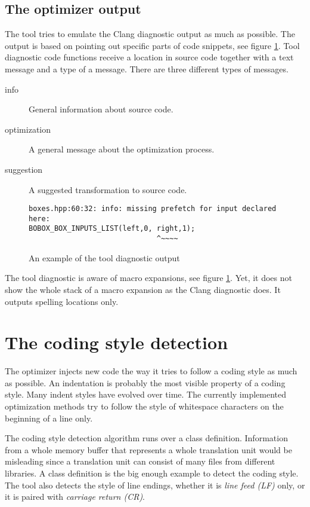 \subsection{The optimizer output}
The tool tries to emulate the Clang diagnostic output as much as possible. The output is based on pointing out specific parts of code snippets, see figure \ref{modes-output}. Tool diagnostic code functions receive a location in source code together with a text message and a type of a message. There are three different types of messages.

\begin{description}
\item[info]{General information about source code.}
\item[optimization]{A general message about the optimization process.}
\item[suggestion]{A suggested transformation to source code.}
\end{description}

\begin{figure}[h!]
\caption{An example of the tool diagnostic output}
\label{modes-output}
\begin{verbatim}
boxes.hpp:60:32: info: missing prefetch for input declared here:
BOBOX_BOX_INPUTS_LIST(left,0, right,1);
                              ^~~~~
\end{verbatim}
\end{figure}

The tool diagnostic is aware of macro expansions, see figure \ref{modes-output}. Yet, it does not show the whole stack of a macro expansion as the Clang diagnostic does. It outputs spelling locations only.

\section{The coding style detection}
The optimizer injects new code the way it tries to follow a coding style as much as possible. An indentation is probably the most visible property of a coding style. Many indent styles have evolved over time. The currently implemented optimization methods try to follow the style of whitespace characters on the beginning of a line only.

The coding style detection algorithm runs over a class definition. Information from a whole memory buffer that represents a whole translation unit would be misleading since a translation unit can consist of many files from different libraries. A class definition is the big enough example to detect the coding style. The tool also detects the style of line endings, whether it is \emph{line feed (LF)} only, or it is paired with \emph{carriage return (CR)}.

